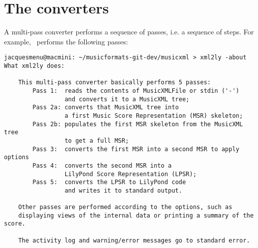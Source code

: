 



\chapter{The converters}

A multi-pass converter performs a sequence of passes, i.e. a sequence of steps. For example, \xmlToLy\ performs the following passes:
\begin{lstlisting}[language=Terminal]
jacquesmenu@macmini: ~/musicformats-git-dev/musicxml > xml2ly -about
What xml2ly does:

    This multi-pass converter basically performs 5 passes:
        Pass 1:  reads the contents of MusicXMLFile or stdin ('-')
                 and converts it to a MusicXML tree;
        Pass 2a: converts that MusicXML tree into
                 a first Music Score Representation (MSR) skeleton;
        Pass 2b: populates the first MSR skeleton from the MusicXML tree
                 to get a full MSR;
        Pass 3:  converts the first MSR into a second MSR to apply options
        Pass 4:  converts the second MSR into a
                 LilyPond Score Representation (LPSR);
        Pass 5:  converts the LPSR to LilyPond code
                 and writes it to standard output.

    Other passes are performed according to the options, such as
    displaying views of the internal data or printing a summary of the score.

    The activity log and warning/error messages go to standard error.
\end{lstlisting}


\section{\xmlToLy}

